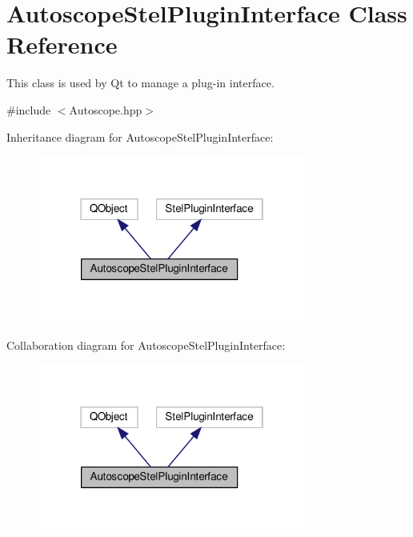 \hypertarget{class_autoscope_stel_plugin_interface}{}\section{Autoscope\+Stel\+Plugin\+Interface Class Reference}
\label{class_autoscope_stel_plugin_interface}


This class is used by Qt to manage a plug-\/in interface.  




{\ttfamily \#include $<$Autoscope.\+hpp$>$}



Inheritance diagram for Autoscope\+Stel\+Plugin\+Interface\+:\nopagebreak
\begin{figure}[H]
\begin{center}
\leavevmode
\includegraphics[width=250pt]{d0/d73/class_autoscope_stel_plugin_interface__inherit__graph}
\end{center}
\end{figure}


Collaboration diagram for Autoscope\+Stel\+Plugin\+Interface\+:\nopagebreak
\begin{figure}[H]
\begin{center}
\leavevmode
\includegraphics[width=250pt]{d1/d41/class_autoscope_stel_plugin_interface__coll__graph}
\end{center}
\end{figure}
